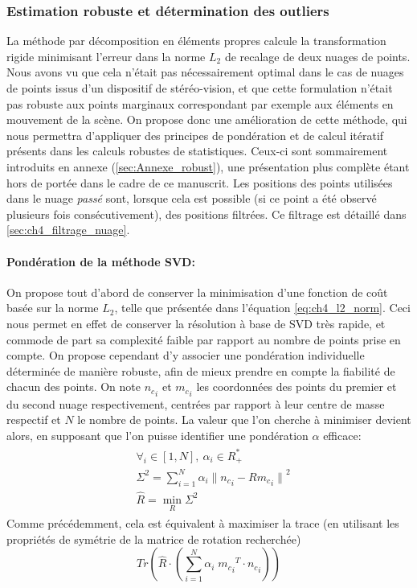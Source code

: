 \subsubsection{Estimation robuste et détermination des outliers} \label{sec:ch4_robust_estimation}
La méthode par décomposition en éléments propres calcule la transformation rigide minimisant l'erreur dans la norme $L_2$ de recalage de deux nuages de points. Nous avons vu que cela n'était pas nécessairement optimal dans le cas de nuages de points issus d'un dispositif de stéréo-vision, et que cette formulation n'était pas robuste aux points marginaux correspondant par exemple aux éléments en mouvement de la scène. On propose donc une amélioration de cette méthode, qui nous permettra d'appliquer des principes de pondération et de calcul itératif présents dans les calculs robustes de statistiques. Ceux-ci sont sommairement introduits en annexe (\ref{sec:Annexe_robust}), une présentation plus complète étant hors de portée dans le cadre de ce manuscrit. Les positions des points utilisées dans le nuage \textit{passé} sont, lorsque cela est possible (si ce point a été observé plusieurs fois consécutivement), des positions filtrées. Ce filtrage est détaillé dans \ref{sec:ch4_filtrage_nuage}.

\paragraph{Pondération de la méthode \og SVD\fg{}:\\} \label{sec:ch4_svd_pondérée}
On propose tout d'abord de conserver la minimisation d'une fonction de coût basée sur la norme $L_2$, telle que présentée dans l'équation \ref{eq:ch4_l2_norm}. Ceci nous permet en effet de conserver la résolution à base de SVD très rapide, et commode de part sa complexité faible par rapport au nombre de points prise en compte. On propose cependant d'y associer une pondération individuelle déterminée de manière robuste, afin de mieux prendre en compte la fiabilité de chacun des points. On note ${n_c}_i$ et ${m_c}_i$ les coordonnées des points du premier et du second nuage respectivement, centrées par rapport à leur centre de masse respectif et $N$ le nombre de points. La valeur que l'on cherche à minimiser devient alors, en supposant que l'on puisse identifier une pondération $\alpha$ efficace:
\begin{align} \label{ch4:eq_to_minimize_weighted}
	\begin{split}
		&\forall_i \in [1,N], \: \alpha_i \in R_{+}^{*} \\
		&\Sigma^2 = \sum\limits_{i=1}^{N} \alpha_i {\| {n_c}_i - R {m_c}_i \|}^2 \\
		&\hat{R} = \min_R \Sigma^2
	\end{split}
\end{align}
Comme précédemment, cela est équivalent à maximiser la trace (en utilisant les propriétés de symétrie de la matrice de rotation recherchée)
\begin{equation} \label{ch4:trace_maximize}
Tr(\hat{R} \cdot (\sum\limits_{i=1}^{N} \alpha_i \; {{m_c}_i}^T \cdot {n_c}_i ))
\end{equation}

